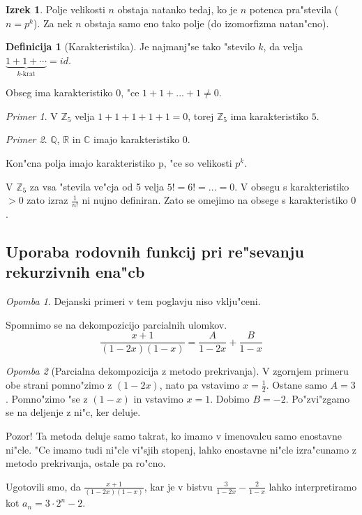 \documentclass[a4paper,12pt]{article}
\theoremstyle{definition}
\newtheorem{defn}[counter]{Definicija}
\newtheorem{theorem}[counter]{Izrek}
\theoremstyle{remark}
\newtheorem*{ex}{Primer}
\newtheorem*{rem}{Opomba}
\newcommand{\Z}{\mathbb{Z}}
\newcommand{\Q}{\mathbb{Q}}
\newcommand{\R}{\mathbb{R}}
\newcommand{\C}{\mathbb{C}}
\begin{document}
\begin{theorem}
    Polje velikosti $n$ obstaja natanko tedaj, ko je $n$ potenca pra"stevila ($n = p^k$). Za nek $n$ obstaja samo eno tako polje (do izomorfizma natan"cno).
\end{theorem}

\begin{defn}[Karakteristika]
	Je najmanj"se tako "stevilo $k$, da velja $\underbrace{1 + 1 + \cdots}_{k\text{-krat}} = id$.
	
	Obseg ima karakteristiko $0$, "ce $1 + 1 + ... + 1 \neq 0$.
\end{defn}
\begin{ex}
	V $\Z_5$ velja $1 + 1 + 1 + 1 + 1 = 0$, torej $\Z_5$ ima karakteristiko $5$.
\end{ex}
\begin{ex}
	$\Q$, $\R$ in $\C$ imajo karakteristiko $0$.
\end{ex}
Kon"cna polja imajo karakteristiko p, "ce so velikosti $p^k$.

V $\Z_5$ za vsa "stevila ve"cja od 5 velja $5! = 6! = ... = 0$.
V obsegu s karakteristiko $> 0$ zato izraz $\frac{1}{n!}$ ni nujno definiran. Zato se omejimo na obsege s karakteristiko $0$.

\subsection{Uporaba rodovnih funkcij pri re"sevanju rekurzivnih ena"cb}
\begin{rem}
	Dejanski primeri v tem poglavju niso vklju"ceni.
	\label{TODO: zakaj ne? A so stupid, al jih mormo se dodat?}
\end{rem}

Spomnimo se na dekompozicijo parcialnih ulomkov.
\[\frac{x + 1}{(1-2x)(1-x)} = \frac{A}{1-2x} + \frac{B}{1-x}\]

\begin{rem}[Parcialna dekompozicija z metodo prekrivanja]
	V zgornjem primeru obe strani pomno"zimo z $(1 - 2x)$, nato pa vstavimo $x = \frac{1}{2}$. Ostane samo $A = 3$. Pomno"zimo "se z $(1 - x)$ in vstavimo $x = 1$. Dobimo $B = -2$. Po"zvi"zgamo se na deljenje z ni"c, ker deluje.
	
	Pozor! Ta metoda deluje samo takrat, ko imamo v imenovalcu samo enostavne ni"cle. "Ce imamo tudi ni"cle vi"sjih stopenj, lahko enostavne ni"cle izra"cunamo z metodo prekrivanja, ostale pa ro"cno.
\end{rem}

Ugotovili smo, da $\frac{x + 1}{(1-2x)(1-x)}$, kar je v bistvu $\frac{3}{1 - 2x} - \frac{2}{1 - x}$ lahko interpretiramo kot $a_n = 3 \cdot 2^n - 2$.
\end{document}
